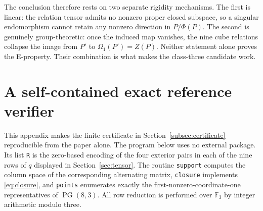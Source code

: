\documentclass[11pt]{amsart}
\theoremstyle{definition}
\theoremstyle{remark}
\newcommand{\F}{\mathbb F}
\newcommand{\PG}{\operatorname{PG}}
\begin{document}
The conclusion therefore rests on two separate rigidity mechanisms.  The
first is linear: the relation tensor admits no nonzero proper closed
subspace, so a singular endomorphism cannot retain any nonzero direction
in $P/\Phi(P)$.  The second is genuinely group-theoretic: once the induced
map vanishes, the nine cube relations collapse the image from $P'$ to
$\Omega_1(P')=Z(P)$.  Neither statement alone proves the E-property.  Their
combination is what makes the class-three candidate work.

\appendix
\section{A self-contained exact reference verifier}\label{app:verifier}

This appendix makes the finite certificate in
Section~\ref{subsec:certificate} reproducible from the paper alone.  The
program below uses no external package.  Its list \texttt{R} is the
zero-based encoding of the four exterior pairs in each of the nine rows of
$q$ displayed in Section~\ref{sec:tensor}.  The routine \texttt{support}
computes the column space of the corresponding alternating matrix,
\texttt{closure} implements \eqref{eq:closure}, and \texttt{points}
enumerates exactly the first-nonzero-coordinate-one representatives of
$\PG(8,3)$.  All row reduction is performed over $\F_3$ by integer
arithmetic modulo three.
\end{document}

